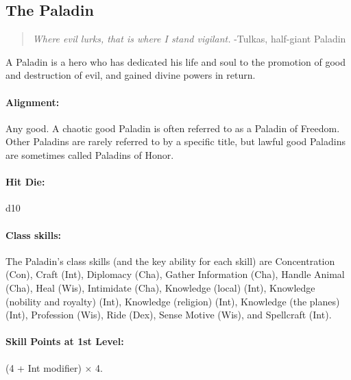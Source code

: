 \subsection[Paladin]{The Paladin}
\label{sec:Paladin}
\begin{quote}
\emph{Where evil lurks, that is where I stand vigilant.}
-Tulkas, half-giant Paladin
\end{quote}

A Paladin is a hero who has dedicated his life and soul to the promotion of good and destruction of evil, and gained divine powers in return.
\paragraph{Alignment:} Any good. A chaotic good Paladin is often referred to as a Paladin of Freedom. Other Paladins are rarely referred to by a specific title, but lawful good Paladins are sometimes called Paladins of Honor.
\paragraph{Hit Die:} d10
\paragraph{Class skills:}
The Paladin's class skills (and the key ability for each skill) are Concentration (Con), Craft (Int), Diplomacy (Cha), Gather Information (Cha), Handle Animal (Cha), Heal (Wis), Intimidate (Cha), Knowledge (local) (Int), Knowledge (nobility and royalty) (Int), Knowledge (religion) (Int), Knowledge (the planes) (Int), Profession (Wis), Ride (Dex), Sense Motive (Wis), and Spellcraft (Int).

\paragraph{Skill Points at 1st Level:} (4 + Int modifier) $\times$ 4.
